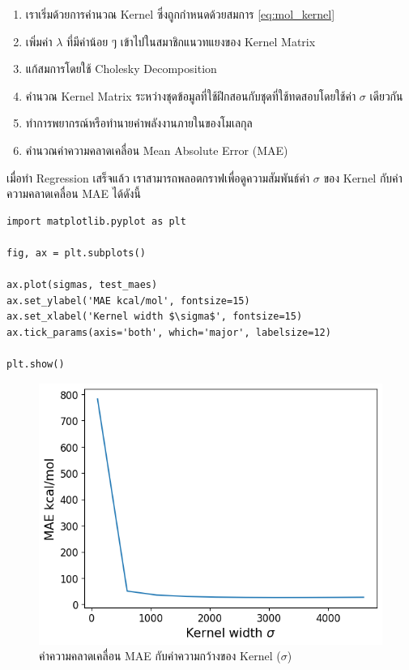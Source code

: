 \begin{enumerate}[noitemsep]
    \item เราเริ่มด้วยการคำนวณ Kernel ซึ่งถูกกำหนดด้วยสมการ \ref{eq:mol_kernel}
    
    \item เพิ่มค่า $\lambda$ ที่มีค่าน้อย ๆ เข้าไปในสมาชิกแนวทแยงของ Kernel Matrix
    
    \item แก้สมการโดยใช้ Cholesky Decomposition
    
    \item คำนวณ Kernel Matrix ระหว่างชุดข้อมูลที่ใช้ฝึกสอนกับชุดที่ใช้ทดสอบโดยใช้ค่า $\sigma$ เดียวกัน
    
    \item ทำการพยากรณ์หรือทำนายค่าพลังงานภายในของโมเลกุล
    
    \item คำนวณค่าความคลาดเคลื่อน Mean Absolute Error (MAE)
\end{enumerate}

เมื่อทำ Regression เสร็จแล้ว เราสามารถพลอตกราฟเพื่อดูความสัมพันธ์ค่า $\sigma$ ของ Kernel กับค่าความคลาดเคลื่อน MAE ได้ดังนี้

\begin{lstlisting}[style=MyPython]
import matplotlib.pyplot as plt

fig, ax = plt.subplots()

ax.plot(sigmas, test_maes)
ax.set_ylabel('MAE kcal/mol', fontsize=15)
ax.set_xlabel('Kernel width $\sigma$', fontsize=15)
ax.tick_params(axis='both', which='major', labelsize=12)

plt.show()
\end{lstlisting}

\begin{figure}[htbp]
    \centering
    \includegraphics[width=0.9\linewidth]{fig/qm9_cm_mae_sigma.png}
    \caption{ค่าความคลาดเคลื่อน MAE กับค่าความกว้างของ Kernel ($\sigma$)}
    \label{fig:qm9_cm_kernel_mae}
\end{figure}

